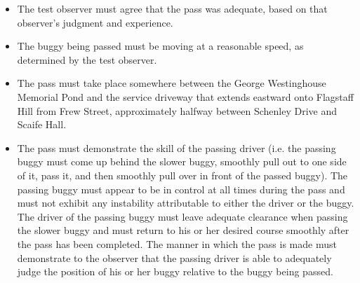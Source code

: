 	\begin{itemize}

		\item The test observer must agree that the pass was adequate, based on
		that observer's judgment and experience.

		\item The buggy being passed must be moving at a reasonable speed, as
		determined by the test observer.

		\item The pass must take place somewhere between the George Westinghouse
		Memorial Pond and the service driveway that extends eastward onto Flagstaff
		Hill from Frew Street, approximately halfway between Schenley Drive and Scaife
		Hall.

		\item The pass must demonstrate the skill of the passing driver (i.e. the
		passing buggy must come up behind the slower buggy, smoothly pull out to one
		side of it, pass it, and then smoothly pull over in front of the passed buggy).
		The passing buggy must appear to be in control at all times during the pass and
		must not exhibit any instability attributable to either the driver or the
		buggy. The driver of the passing buggy must leave adequate clearance when
		passing the slower buggy and must return to his or her desired course smoothly
		after the pass has been completed. The manner in which the pass is made must
		demonstrate to the observer that the passing driver is able to adequately judge
		the position of his or her buggy relative to the buggy being passed.

	\end{itemize}


